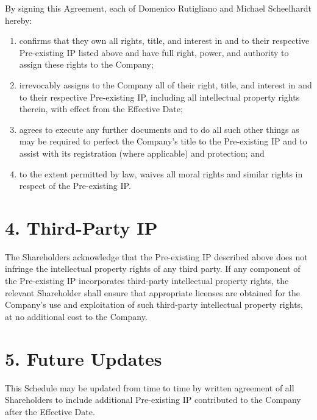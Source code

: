 By signing this Agreement, each of Domenico Rutigliano and Michael Scheelhardt hereby:

\begin{enumerate}[label=(\alph*)]
\item confirms that they own all rights, title, and interest in and to their respective Pre-existing IP listed above and have full right, power, and authority to assign these rights to the Company;
\item irrevocably assigns to the Company all of their right, title, and interest in and to their respective Pre-existing IP, including all intellectual property rights therein, with effect from the Effective Date;
\item agrees to execute any further documents and to do all such other things as may be required to perfect the Company's title to the Pre-existing IP and to assist with its registration (where applicable) and protection; and
\item to the extent permitted by law, waives all moral rights and similar rights in respect of the Pre-existing IP.
\end{enumerate}

\section*{4. Third-Party IP}

The Shareholders acknowledge that the Pre-existing IP described above does not infringe the intellectual property rights of any third party. If any component of the Pre-existing IP incorporates third-party intellectual property rights, the relevant Shareholder shall ensure that appropriate licenses are obtained for the Company's use and exploitation of such third-party intellectual property rights, at no additional cost to the Company.

\section*{5. Future Updates}

This Schedule may be updated from time to time by written agreement of all Shareholders to include additional Pre-existing IP contributed to the Company after the Effective Date. 